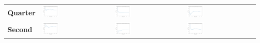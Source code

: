 \begin{tabular}{>{\centering\arraybackslash}m{}>{\centering\arraybackslash}m{}>{\centering\arraybackslash}m{}>{\centering\arraybackslash}m{}}
    \textbf{Quarter} & \includegraphics[width=0.25\textwidth]{images/win_rate_dqn_experiment_quarter_yes_vs_random.png} &
    \includegraphics[width=0.25\textwidth]{images/win_rate_dqn_experiment_quarter_yes_vs_ql.png} &
    \includegraphics[width=0.25\textwidth]{images/win_rate_dqn_experiment_quarter_yes_vs_dqn.png} \\
    \textbf{Second} & \includegraphics[width=0.25\textwidth]{images/win_rate_dqn_experiment_second_yes_vs_random.png} &
    \includegraphics[width=0.25\textwidth]{images/win_rate_dqn_experiment_second_yes_vs_ql.png} &
    \includegraphics[width=0.25\textwidth]{images/win_rate_dqn_experiment_second_yes_vs_dqn.png} \\
  \end{tabular}

